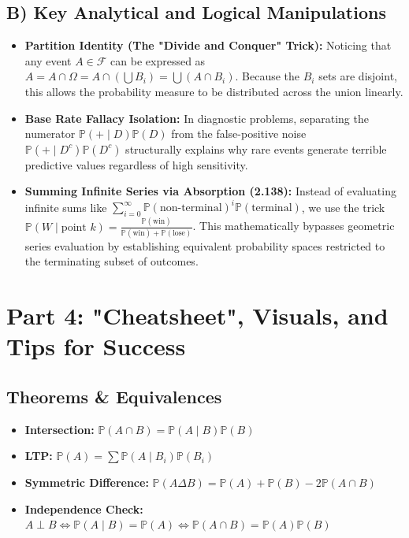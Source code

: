 \documentclass[12pt]{article}
\theoremstyle{definition}
\theoremstyle{remark}
\newcommand{\Pbb}{\mathbb{P}}
\newcommand{\Fcal}{\mathcal{F}}
\newcommand{\OmegaSet}{\Omega}
\begin{document}
\subsection{B) Key Analytical and Logical Manipulations}
\begin{itemize}
    \item \textbf{Partition Identity (The "Divide and Conquer" Trick):} Noticing that any event $A \in \Fcal$ can be expressed as $A = A \cap \OmegaSet = A \cap \left( \bigcup B_i \right) = \bigcup (A \cap B_i)$. Because the $B_i$ sets are disjoint, this allows the probability measure to be distributed across the union linearly.
    \item \textbf{Base Rate Fallacy Isolation:} In diagnostic problems, separating the numerator $\Pbb(+ \mid D)\Pbb(D)$ from the false-positive noise $\Pbb(+ \mid D^c)\Pbb(D^c)$ structurally explains why rare events generate terrible predictive values regardless of high sensitivity.
    \item \textbf{Summing Infinite Series via Absorption (2.138):} Instead of evaluating infinite sums like $\sum_{i=0}^\infty \Pbb(\text{non-terminal})^i \Pbb(\text{terminal})$, we use the trick $\Pbb(W \mid \text{point } k) = \frac{\Pbb(\text{win})}{\Pbb(\text{win}) + \Pbb(\text{lose})}$. This mathematically bypasses geometric series evaluation by establishing equivalent probability spaces restricted to the terminating subset of outcomes.
\end{itemize}

\newpage
\section{Part 4: "Cheatsheet", Visuals, and Tips for Success}

\subsection{Theorems \& Equivalences}
\begin{itemize}
    \item \textbf{Intersection:} $\Pbb(A \cap B) = \Pbb(A \mid B)\Pbb(B)$
    \item \textbf{LTP:} $\Pbb(A) = \sum \Pbb(A \mid B_i)\Pbb(B_i)$
    \item \textbf{Symmetric Difference:} $\Pbb(A \Delta B) = \Pbb(A) + \Pbb(B) - 2\Pbb(A \cap B)$
    \item \textbf{Independence Check:} $A \perp B \iff \Pbb(A \mid B) = \Pbb(A) \iff \Pbb(A \cap B) = \Pbb(A)\Pbb(B)$
\end{itemize}
\end{document}
